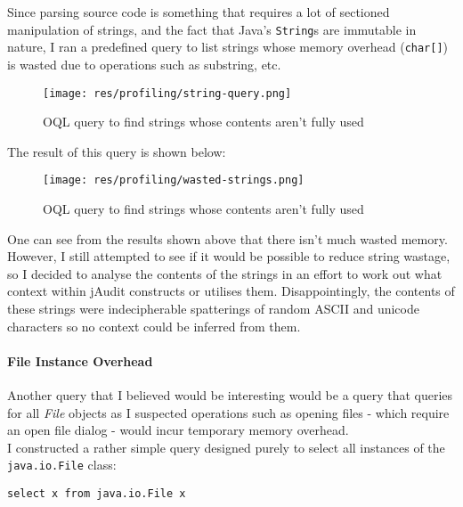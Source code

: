 \documentclass[9pt]{article}
\renewenvironment{framed}[1][\hsize]
   {\MakeFramed{\hsize#1\advance\hsize-\width \FrameRestore}}%
   {\endMakeFramed}
\begin{document}
			Since parsing source code is something that requires a lot of
			sectioned manipulation of strings, and the fact that Java's
			\texttt{String}s are immutable in nature, I ran a predefined query
			to list strings whose memory overhead (\texttt{char[]}) is wasted
			due to operations such as substring, etc.\\

			\begin{figure}[H]
				\centering
				\texttt{[image: res/profiling/string-query.png]}
				\caption{OQL query to find strings whose contents aren't fully
				used}
			\end{figure}

			The result of this query is shown below:\\

			\begin{figure}[H]
				\centering
				\texttt{[image: res/profiling/wasted-strings.png]}
				\caption{OQL query to find strings whose contents aren't fully
				used}
			\end{figure}

			One can see from the results shown above that there isn't much
			wasted memory. However, I still attempted to see if it would be
			possible to reduce string wastage, so I decided to analyse the
			contents of the strings in an effort to work out what context within
			jAudit constructs or utilises them. Disappointingly, the contents of
			these strings were indecipherable spatterings of random ASCII and
			unicode characters so no context could be inferred from them.\\

			\paragraph{File Instance Overhead}

			Another query that I believed would be interesting would be a query
			that queries for all \textit{File} objects as I suspected operations
			such as opening files - which require an open file dialog - would
			incur temporary memory overhead.\\

			I constructed a rather simple query designed purely to select all
			instances of the \texttt{java.io.File} class:\\

			\begin{framed}
				\begin{lstlisting}
select x from java.io.File x
				\end{lstlisting}
			\end{framed}
\end{document}
